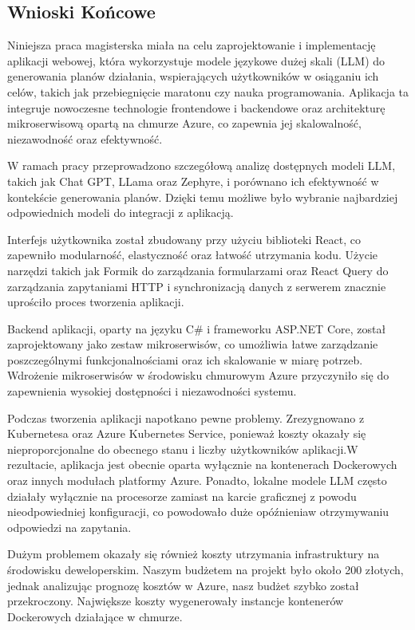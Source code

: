 \subsection{Wnioski Końcowe}

Niniejsza praca magisterska miała na celu zaprojektowanie i implementację aplikacji webowej, która wykorzystuje modele językowe dużej skali (LLM) do generowania planów działania, wspierających użytkowników w osiąganiu ich celów, takich jak przebiegnięcie maratonu czy nauka programowania. Aplikacja ta integruje nowoczesne technologie frontendowe \linebreak i backendowe oraz architekturę mikroserwisową opartą na chmurze Azure, co zapewnia jej skalowalność, niezawodność oraz efektywność.

W ramach pracy przeprowadzono szczegółową analizę dostępnych modeli LLM, takich jak Chat GPT, LLama oraz Zephyre, i porównano ich efektywność w kontekście generowania planów. Dzięki temu możliwe było wybranie najbardziej odpowiednich modeli do integracji z aplikacją.

Interfejs użytkownika został zbudowany przy użyciu biblioteki React, co zapewniło modularność, elastyczność oraz łatwość utrzymania kodu. Użycie narzędzi takich jak Formik do zarządzania formularzami oraz React Query do zarządzania zapytaniami HTTP i synchronizacją danych z serwerem znacznie uprościło proces tworzenia aplikacji.

Backend aplikacji, oparty na języku C\# i frameworku ASP.NET Core, został zaprojektowany jako zestaw mikroserwisów, co umożliwia łatwe zarządzanie poszczególnymi funkcjonalnościami oraz ich skalowanie w miarę potrzeb. Wdrożenie mikroserwisów w środowisku chmurowym Azure przyczyniło się do zapewnienia wysokiej dostępności i niezawodności systemu.

Podczas tworzenia aplikacji napotkano pewne problemy. Zrezygnowano z Kubernetesa oraz Azure Kubernetes Service, ponieważ koszty okazały się nieproporcjonalne do obecnego stanu i liczby użytkowników aplikacji.\linebreak W rezultacie, aplikacja jest obecnie oparta wyłącznie na kontenerach Dockerowych oraz innych modułach platformy Azure. Ponadto, lokalne modele LLM często działały wyłącznie na procesorze zamiast na karcie graficznej z powodu nieodpowiedniej konfiguracji, co powodowało duże opóźnienia\linebreak w otrzymywaniu odpowiedzi na zapytania. 

Dużym problemem okazały się również koszty utrzymania infrastruktury na środowisku deweloperskim. Naszym budżetem na projekt było około 200 złotych, jednak analizując prognozę kosztów w Azure, nasz budżet szybko został przekroczony. Największe koszty wygenerowały instancje kontenerów Dockerowych działające w chmurze.

